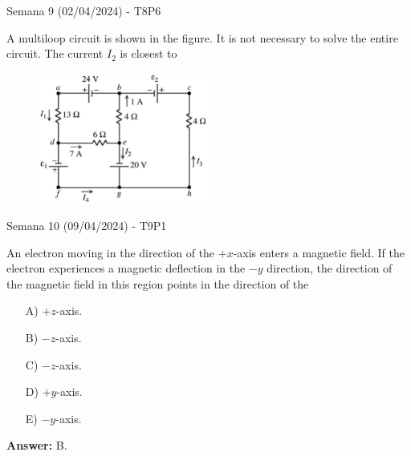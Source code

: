 \begin{frame}{Semana 9 (02/04/2024) - T8P6}
    
    A multiloop circuit is shown in the figure. It is not necessary to solve the entire circuit. The current $I_2$ is closest to

    \begin{figure}
    \centering
    \includegraphics[width=0.5\textwidth]{figures/t8p6.png}
    \end{figure}
    
\end{frame}

\begin{frame}{Semana 10 (09/04/2024) - T9P1}

    An electron moving in the direction of the $+x$-axis enters a magnetic field. If the electron experiences a magnetic deflection in the $-y$ direction, the direction of the magnetic field in this region points in the direction of the
   
   \begin{itemize}
       \item[A)] $+z$-axis.
       \item[B)] $-z$-axis.
       \item[C)] $-z$-axis.
       \item[D)] $+y$-axis.
       \item[E)] $-y$-axis.
   \end{itemize}
   
   \pause \centering \textbf{Answer:} B.
    
\end{frame}

